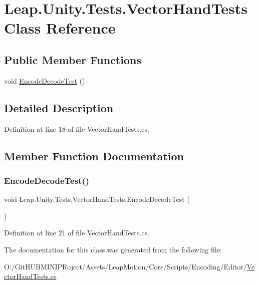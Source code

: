 \hypertarget{class_leap_1_1_unity_1_1_tests_1_1_vector_hand_tests}{}\section{Leap.\+Unity.\+Tests.\+Vector\+Hand\+Tests Class Reference}
\label{class_leap_1_1_unity_1_1_tests_1_1_vector_hand_tests}
\subsection*{Public Member Functions}
\begin{DoxyCompactItemize}
\item 
void \mbox{\hyperlink{class_leap_1_1_unity_1_1_tests_1_1_vector_hand_tests_aa23ec5c3ff8970cbc68558254b215d56}{Encode\+Decode\+Test}} ()
\end{DoxyCompactItemize}


\subsection{Detailed Description}


Definition at line 18 of file Vector\+Hand\+Tests.\+cs.



\subsection{Member Function Documentation}
\mbox{\label{class_leap_1_1_unity_1_1_tests_1_1_vector_hand_tests_aa23ec5c3ff8970cbc68558254b215d56}} 
\subsubsection{\texorpdfstring{EncodeDecodeTest()}{EncodeDecodeTest()}}
{\footnotesize\ttfamily void Leap.\+Unity.\+Tests.\+Vector\+Hand\+Tests.\+Encode\+Decode\+Test (\begin{DoxyParamCaption}{ }\end{DoxyParamCaption})}



Definition at line 21 of file Vector\+Hand\+Tests.\+cs.



The documentation for this class was generated from the following file\+:\begin{DoxyCompactItemize}
\item 
O\+:/\+Git\+H\+U\+B\+M\+I\+N\+I\+P\+Roject/\+Assets/\+Leap\+Motion/\+Core/\+Scripts/\+Encoding/\+Editor/\mbox{\hyperlink{_vector_hand_tests_8cs}{Vector\+Hand\+Tests.\+cs}}\end{DoxyCompactItemize}
